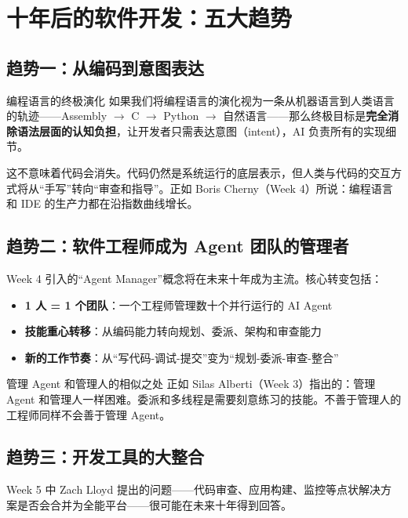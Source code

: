 \section{十年后的软件开发：五大趋势}

\subsection{趋势一：从编码到意图表达}

\begin{importantbox}{编程语言的终极演化}
如果我们将编程语言的演化视为一条从机器语言到人类语言的轨迹——Assembly $\rightarrow$ C $\rightarrow$ Python $\rightarrow$ 自然语言——那么终极目标是\textbf{完全消除语法层面的认知负担}，让开发者只需表达意图（intent），AI 负责所有的实现细节。
\end{importantbox}

这不意味着代码会消失。代码仍然是系统运行的底层表示，但人类与代码的交互方式将从``手写''转向``审查和指导''。正如 Boris Cherny（Week 4）所说：编程语言和 IDE 的生产力都在沿指数曲线增长。

\subsection{趋势二：软件工程师成为 Agent 团队的管理者}

Week 4 引入的``Agent Manager''概念将在未来十年成为主流。核心转变包括：

\begin{itemize}
    \item \textbf{1 人 = 1 个团队}：一个工程师管理数十个并行运行的 AI Agent
    \item \textbf{技能重心转移}：从编码能力转向规划、委派、架构和审查能力
    \item \textbf{新的工作节奏}：从``写代码-调试-提交''变为``规划-委派-审查-整合''
\end{itemize}

\begin{knowledgebox}{管理 Agent 和管理人的相似之处}
正如 Silas Alberti（Week 3）指出的：管理 Agent 和管理人一样困难。委派和多线程是需要刻意练习的技能。不善于管理人的工程师同样不会善于管理 Agent。
\end{knowledgebox}

\subsection{趋势三：开发工具的大整合}

Week 5 中 Zach Lloyd 提出的问题——代码审查、应用构建、监控等点状解决方案是否会合并为全能平台——很可能在未来十年得到回答。

